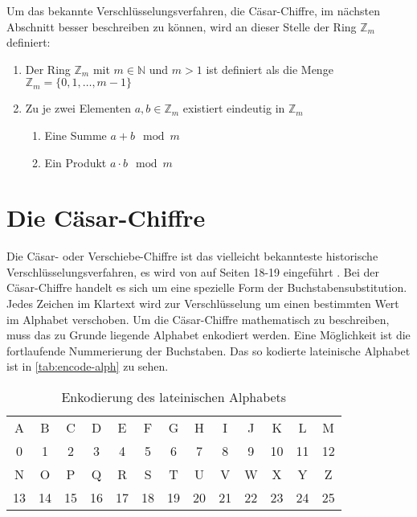 \noindent
Um das bekannte Verschlüsselungsverfahren, die Cäsar-Chiffre, im nächsten Abschnitt
besser beschreiben zu können, wird an dieser Stelle der Ring $\mathbb{Z}_m$ definiert:
\newpage
\begin{definition}[Der Ring $\mathbb{Z}_m$ der Reste modulo $m$]
  \leavevmode
  \begin{enumerate}[itemsep = 0pt]
    \item Der Ring $\mathbb{Z}_m$ mit $m \in \mathbb{N}$ und $m > 1$ ist
          definiert als die Menge $\mathbb{Z}_m = \{0,1,\dots,m - 1\}$
    \item Zu je zwei Elementen $a,b \in \mathbb{Z}_m$ existiert eindeutig in $\mathbb{Z}_m$
          \begin{enumerate}[itemsep = 0pt, topsep=0pt]
            \item Eine Summe $a + b \mod{m}$
            \item Ein Produkt $a \cdot b \mod{m}$
          \end{enumerate}
  \end{enumerate}
\end{definition}

\section{Die Cäsar-Chiffre} \label{sec:shift-cipher}
Die Cäsar- oder Verschiebe-Chiffre ist das vielleicht bekannteste historische Verschlüs\-selungsverfahren,
es wird von \citeauthor{BOOK:crypto} auf Seiten 18-19 eingeführt \parencite*{BOOK:crypto}.
Bei der Cäsar-Chiffre handelt es sich um eine spezielle Form der Buchstabensubstitution.
Jedes Zeichen im Klartext wird zur Verschlüsselung um einen bestimmten Wert
im Alphabet verschoben.
Um die Cäsar-Chiffre mathematisch zu
beschreiben, muss das zu Grunde liegende Alphabet enkodiert werden.
Eine Möglichkeit ist die fortlaufende Nummerierung der Buchstaben. Das so kodierte
lateinische Alphabet ist in \autoref{tab:encode-alph} zu sehen.

\begin{table}[h]
  \centering
  \caption{Enkodierung des lateinischen Alphabets}
  \begin{tabular}{|c|c|c|c|c|c|c|c|c|c|c|c|c|}
    \hline
    A  & B  & C  & D  & E  & F  & G  & H  & I  & J  & K  & L  & M  \\
    0  & 1  & 2  & 3  & 4  & 5  & 6  & 7  & 8  & 9  & 10 & 11 & 12 \\
    \hline
    N  & O  & P  & Q  & R  & S  & T  & U  & V  & W  & X  & Y  & Z  \\
    13 & 14 & 15 & 16 & 17 & 18 & 19 & 20 & 21 & 22 & 23 & 24 & 25 \\
    \hline
  \end{tabular}
  \label{tab:encode-alph}
\end{table}

